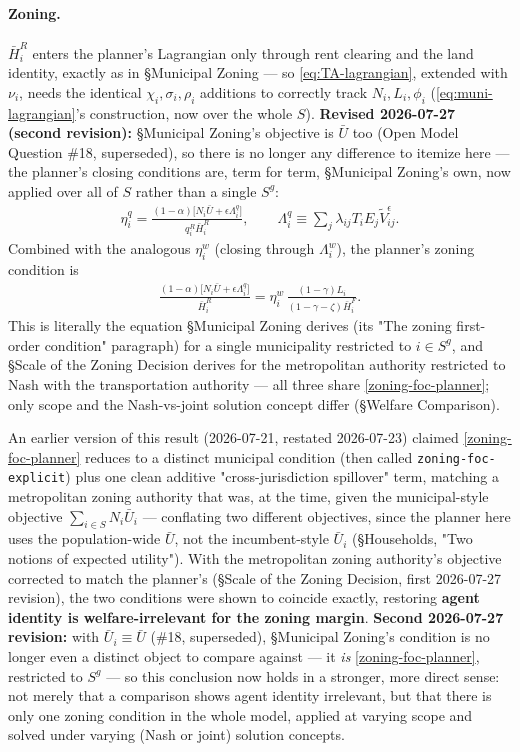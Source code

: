 \documentclass[12pt, a4paper]{article}
\theoremstyle{definition}
\theoremstyle{remark}
\begin{document}
\paragraph{Zoning.} $\bar H_i^R$ enters the planner's Lagrangian only through rent clearing and the land identity, exactly as in \S Municipal Zoning — so \eqref{eq:TA-lagrangian}, extended with $\nu_i$, needs the identical $\chi_i,\sigma_i,\rho_i$ additions to correctly track $N_i,L_i,\phi_i$ (\eqref{eq:muni-lagrangian}'s construction, now over the whole $S$). \textbf{Revised 2026-07-27 (second revision):} \S Municipal Zoning's objective is $\bar U$ too (Open Model Question \#18, superseded), so there is no longer any difference to itemize here — the planner's closing conditions are, term for term, \S Municipal Zoning's own, now applied over all of $S$ rather than a single $S^g$:
\begin{align}
    \label{eq:SP-etaq}
\eta_i^q = \frac{(1-\alpha)\bigl[N_i\bar U+\epsilon\Lambda_i^q\bigr]}{q_i^R\bar H_i^R}, \qquad \Lambda_i^q\equiv\sum_j\lambda_{ij}T_iE_j\tilde V_{ij}^\epsilon.
\end{align}
Combined with the analogous $\eta_i^w$ (closing through $\Lambda_i^w$), the planner's zoning condition is
\begin{align}
    \label{zoning-foc-planner}
\frac{(1-\alpha)\bigl[N_i\bar U+\epsilon\Lambda_i^q\bigr]}{\bar H_i^R} = \eta_i^w\,\frac{(1-\gamma)L_i}{(1-\gamma-\zeta)\bar H_i^F}.
\end{align}
This is literally the equation \S Municipal Zoning derives (its "The zoning first-order condition" paragraph) for a single municipality restricted to $i\in S^g$, and \S Scale of the Zoning Decision derives for the metropolitan authority restricted to Nash with the transportation authority — all three share \eqref{zoning-foc-planner}; only scope and the Nash-vs-joint solution concept differ (\S Welfare Comparison).

An earlier version of this result (2026-07-21, restated 2026-07-23) claimed \eqref{zoning-foc-planner} reduces to a distinct municipal condition (then called \texttt{zoning-foc-explicit}) plus one clean additive "cross-jurisdiction spillover" term, matching a metropolitan zoning authority that was, at the time, given the municipal-style objective $\sum_{i\in S}N_i\bar U_i$ — conflating two different objectives, since the planner here uses the population-wide $\bar U$, not the incumbent-style $\bar U_i$ (\S Households, "Two notions of expected utility"). With the metropolitan zoning authority's objective corrected to match the planner's (\S Scale of the Zoning Decision, first 2026-07-27 revision), the two conditions were shown to coincide exactly, restoring \textbf{agent identity is welfare-irrelevant for the zoning margin}. \textbf{Second 2026-07-27 revision:} with $\bar U_i\equiv\bar U$ (\#18, superseded), \S Municipal Zoning's condition is no longer even a distinct object to compare against — it \emph{is} \eqref{zoning-foc-planner}, restricted to $S^g$ — so this conclusion now holds in a stronger, more direct sense: not merely that a comparison shows agent identity irrelevant, but that there is only one zoning condition in the whole model, applied at varying scope and solved under varying (Nash or joint) solution concepts.
\end{document}
